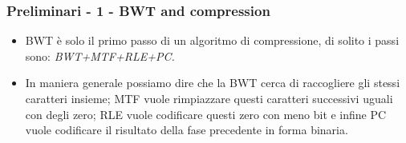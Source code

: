 \documentclass{beamer}
\begin{document}
\begin{frame}
 \frametitle{Preliminari - 1 - BWT and compression}
 \begin{itemize}
 	\item BWT è solo il primo passo di un algoritmo di compressione, di solito i passi sono: \textit{BWT+MTF+RLE+PC.}\pause
 	\item In maniera generale possiamo dire che la BWT cerca di raccogliere gli stessi caratteri insieme; MTF vuole rimpiazzare questi caratteri successivi uguali con degli zero; RLE vuole codificare questi zero con meno bit e infine PC vuole codificare il risultato della fase precedente in forma binaria. 
 \end{itemize}
\end{frame}

%
%	
%
\end{document}
